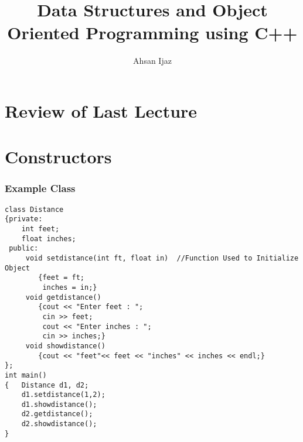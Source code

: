 \documentclass{beamer}
\newtheorem{Key points}{Key points}
\newcommand\Fontvia{\fontsize{6}{7.2}\selectfont}
\begin{document}
\title[Lecture 2]{Data Structures and Object Oriented Programming using C++} 
\author[]{Ahsan Ijaz}
\date{}
 \frame{\titlepage}
\section{Review of Last Lecture}
\section{}
\section{Constructors}

\begin{frame}[fragile]
\frametitle{Example Class}
\Fontvia
\begin{lstlisting}
class Distance
{private:
	int feet;
	float inches;
 public:
	 void setdistance(int ft, float in)  //Function Used to Initialize Object
		{feet = ft;
		 inches = in;}
	 void getdistance()
		{cout << "Enter feet : "; 
		 cin >> feet;
		 cout << "Enter inches : "; 
		 cin >> inches;}
	 void showdistance()
		{cout << "feet"<< feet << "inches" << inches << endl;}
};
int main()
{	Distance d1, d2;
 	d1.setdistance(1,2);
	d1.showdistance();
	d2.getdistance();
	d2.showdistance();
}
\end{lstlisting}
\end{frame}
\end{document}
